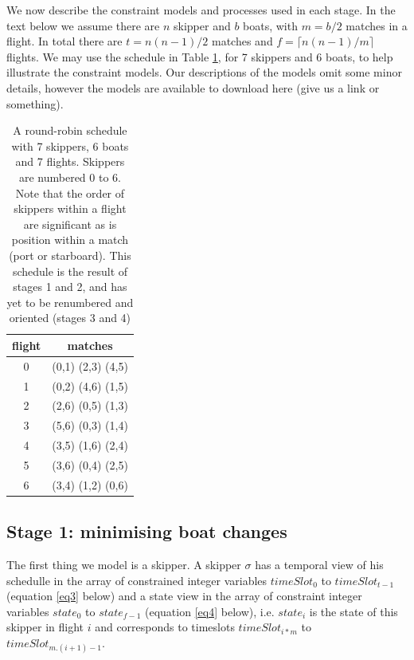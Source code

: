 \documentclass{llncs}
\begin{document}
We now describe the constraint models and processes used in each stage. In the
text below we assume there are $n$ skipper and $b$ boats, with $m = b/2$
matches in a flight. In total there are $t = n(n-1)/2$ matches and $f = \lceil
n(n-1)/m  \rceil$ flights. We may use the schedule in Table \ref{tab1}, for 7
skippers and 6 boats, to help illustrate the constraint models. Our
descriptions of the models omit some minor details, however the models are
available to download here (give us a link or something).

\begin{table}[h]
\begin{center}
\begin{tabular}{cc} \\ 
flight & matches \\ \hline
0 & (0,1) (2,3) (4,5)  \\
1 & (0,2) (4,6) (1,5)  \\
2 & (2,6) (0,5) (1,3)  \\
3 & (5,6) (0,3) (1,4)  \\
4 & (3,5) (1,6) (2,4)  \\
5 & (3,6) (0,4) (2,5)  \\
6 & (3,4) (1,2) (0,6)  \\ \hline
\end{tabular}
\end{center}
\caption{A round-robin schedule with 7 skippers, 6 boats and 7 flights. Skippers are numbered 0 to 6. Note that the order of skippers within a flight are significant as is position within a match (port or starboard). This schedule is the result of stages 1 and 2, and has yet to be renumbered and oriented (stages 3 and 4)}
\label{tab1}
\end{table}

\subsection{Stage 1: minimising boat changes}
The first thing we model is a skipper. A skipper $\sigma$ has a temporal view of his schedulle in the array of constrained integer variables $timeSlot_{0}$ to $timeSlot_{t-1}$ (equation \ref{eq3} below) and a state view in the array of constraint integer variables $state_{0}$ to $state_{f-1}$ (equation \ref{eq4} below), i.e. $state_{i}$ is the state of this skipper in flight $i$ and corresponds to timeslots $timeSlot_{i*m}$ to $timeSlot_{m.(i+1)-1}$.
\end{document}
